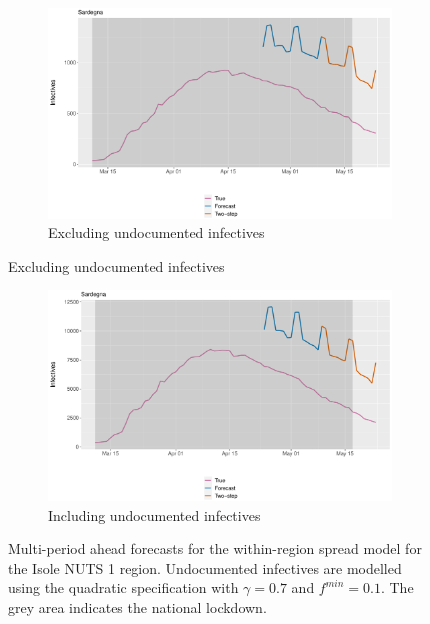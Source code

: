 \documentclass[12pt]{article}
\begin{document}
\begin{appendices}
        \begin{figure}[H]
    	    \centering
    	    \begin{subfigure}{\textwidth}
    	      \centering
    	      \includegraphics[width=0.91\linewidth]{output/model_within_lag14_forecast_full_Isole.pdf}
    	      \caption{Excluding undocumented infectives}
    	      \label{fig:forecast_full_within_isole_regular}
    	    \end{subfigure}
        \end{figure}
        \begin{figure}[H]\ContinuedFloat
    	    \begin{subfigure}{\textwidth}
    	      \centering
    	      \includegraphics[width=0.91\linewidth]{output/model_within_lag14_forecast_full_Isole_UndocQuadratic.pdf}
    	      \caption{Including undocumented infectives}
    	      \label{fig:forecast_full_within_isole_undoc}
    	    \end{subfigure}
    	    \caption{Multi-period ahead forecasts for the within-region spread model for the Isole NUTS 1 region. Undocumented infectives are modelled using the quadratic specification with $\gamma = 0.7$ and $f^{min}=0.1$. The grey area indicates the national lockdown.}
    	    \label{fig:forecast_full_within_isole}
        \end{figure}
		

\end{appendices}
\end{document}
